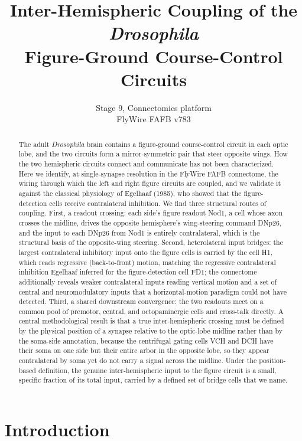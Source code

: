 \documentclass[11pt]{article}
\title{\bfseries Inter-Hemispheric Coupling of the \textit{Drosophila}\\
Figure-Ground Course-Control Circuits}
\author{Stage 9, Connectomics platform \\ \small FlyWire FAFB v783}
\date{}
\begin{document}
\maketitle

\begin{abstract}
\noindent
The adult \textit{Drosophila} brain contains a figure-ground course-control circuit in each optic
lobe, and the two circuits form a mirror-symmetric pair that steer opposite wings. How the two
hemispheric circuits connect and communicate has not been characterized. Here we identify, at
single-synapse resolution in the FlyWire FAFB connectome, the wiring through which the left and
right figure circuits are coupled, and we validate it against the classical physiology of
Egelhaaf (1985), who showed that the figure-detection cells receive contralateral inhibition. We
find three structural routes of coupling. First, a readout crossing: each side's figure readout
Nod1, a cell whose axon crosses the midline, drives the opposite hemisphere's wing-steering
command DNp26, and the input to each DNp26 from Nod1 is entirely contralateral, which is the
structural basis of the opposite-wing steering. Second, heterolateral input bridges: the largest
contralateral inhibitory input onto the figure cells is carried by the cell H1, which reads
regressive (back-to-front) motion, matching the regressive contralateral inhibition Egelhaaf
inferred for the figure-detection cell FD1; the connectome additionally reveals weaker
contralateral inputs reading vertical motion and a set of central and neuromodulatory inputs that
a horizontal-motion paradigm could not have detected. Third, a shared downstream convergence: the
two readouts meet on a common pool of premotor, central, and octopaminergic cells and cross-talk
directly. A central methodological result is that a true inter-hemispheric crossing must be
defined by the physical position of a synapse relative to the optic-lobe midline rather than by
the soma-side annotation, because the centrifugal gating cells VCH and DCH have their soma on one
side but their entire arbor in the opposite lobe, so they appear contralateral by soma yet do not
carry a signal across the midline. Under the position-based definition, the genuine
inter-hemispheric input to the figure circuit is a small, specific fraction of its total input,
carried by a defined set of bridge cells that we name.
\end{abstract}

\section{Introduction}
\end{document}
